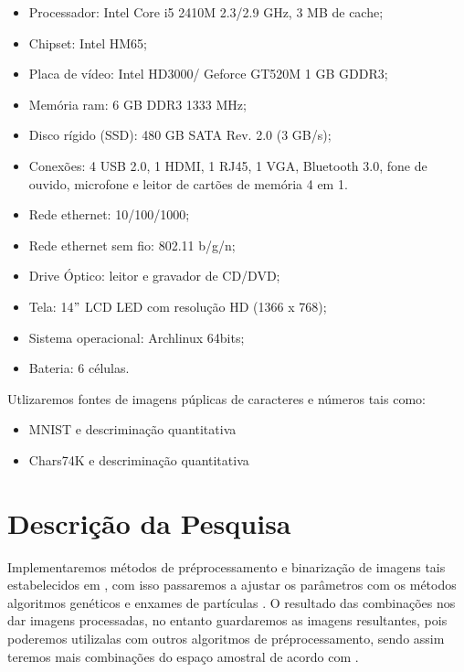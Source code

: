 \documentclass[12pt,a4paper,oneside]{book}
\newcommand\wb[1]{\discretionary{#1}{#1}{#1}}
\begin{document}
{\begin{itemize}
    \item Processador: Intel Core i5 2410M 2.3/2.9 GHz, 3 MB de cache;
    \item Chipset: Intel HM65;
    \item Placa de v\'{i}deo: Intel HD3000/ Geforce GT520M 1 GB GDDR3;
    \item Mem\'{o}ria ram: 6 GB DDR3 1333 MHz;
    \item Disco r\'{i}gido (SSD): 480 GB SATA Rev. 2.0 (3 GB/s);
    \item Conex\~{o}es: 4 USB 2.0, 1 HDMI, 1 RJ45, 1 VGA, Bluetooth 3.0, fone de
        ouvido, microfone e leitor de cart\~{o}es de mem\'{o}ria 4 em 1.
    \item Rede ethernet: 10/100/1000;
    \item Rede ethernet sem fio: 802.11 b/g/n;
    \item Drive \'{O}ptico: leitor e gravador de CD/DVD;
    \item Tela: 14$"$ LCD LED com resolu\c{c}\~{a}o HD (1366 x 768);
    \item Sistema operacional: Archlinux 64bits;
    \item Bateria: 6 c\'{e}lulas.
\end{itemize}

\noindent
Utlizaremos fontes de imagens p\'{u}plicas de caracteres e n\'{u}meros tais
como:

\begin{itemize}
    \item MNIST \cite[MNIST]{} e descrimina\c{c}\~{a}o quantitativa
    \item Chars74K \cite[Chars74K]{} e descrimina\c{c}\~{a}o
        quantitativa
\end{itemize}
\section{Descri\c{c}\~{a}o da Pesquisa}
Implementaremos m\'{e}todos de pr\'{e}\wb-processamento e binariza\c{c}\~{a}o de
imagens tais estabelecidos em \cite{GUPTA2007}, com isso
passaremos a ajustar os par\^{a}metros com os m\'{e}todos algoritmos
gen\'{e}ticos \cite[GA]{} e enxames de part\'{i}culas
\cite[PSO]{}. O resultado das combina\c{c}\~{o}es nos dar imagens
processadas, no entanto guardaremos as imagens resultantes, pois poderemos
utiliza\wb-las com outros algoritmos de pr\'{e}\wb-processamento, sendo assim
teremos mais combina\c{c}\~{o}es do espa\c{c}o amostral de acordo com
\cite[Pipeline-processamento-imagens]{}.

}
\end{document}
